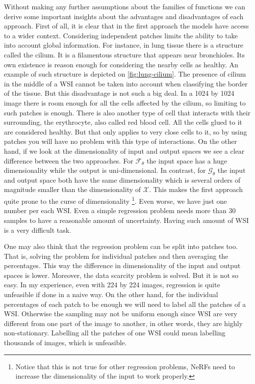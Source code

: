Without making any further assumptions about the families of functions we can derive some important insights about the advantages and disadvantages of each approach. First of all, it is clear that in the first approach the models have access to a wider context. Considering independent patches limits the ability to take into account global information. For instance, in lung tissue there is a structure called the cilium. It is a filamentous structure that appears near bronchioles. Its own existence is reason enough for considering the nearby cells as healthy. An example of such structure is depicted on \autoref{fig:lung-cilium}. The presence of cilium in the middle of a WSI cannot be taken into account when classifying the border of the tissue. But this disadvantage is not such a big deal. In a 1024 by 1024 image there is room enough for all the cells affected by the cilium, so limiting to such patches is enough. There is also another type of cell that interacts with their surrounding, the erythrocyte, also called red blood cell. All the cells glued to it are considered healthy. But that only applies to very close cells to it, so by using patches you will have no problem with this type of interactions. On the other hand, if we look at the dimensionality of input and output spaces we see a clear difference between the two approaches. For $\mathcal{F}_\theta$ the input space has a huge dimensionality while the output is uni-dimensional. In contrast, for $\mathcal{G}_\theta$ the input and output space both have the same dimensionality which is several orders of magnitude smaller than the dimensionality of $\mathcal{X}$. This makes the first approach quite prone to the curse of dimensionality \cite{AnalyticsVidhya}\footnote{Notice that this is not true for other regression problems, NeRFs \cite{mildenhall2020nerf} need to increase the dimensionality of the input to work properly.}. Even worse, we have just one number per each WSI. Even a simple regression problem needs more than 30 samples to have a reasonable amount of uncertainty. Having such amount of WSI is a very difficult task.

One may also think that the regression problem can be split into patches too. That is, solving the problem for individual patches and then averaging the percentages. This way the difference in dimensionality of the input and output spaces is lower. Moreover, the data scarcity problem is solved. But it is not so easy. In my experience, even with 224 by 224 images, regression is quite unfeasible if done in a naive way. On the other hand, for the individual percentages of each patch to be enough we will need to label all the patches of a WSI. Otherwise the sampling may not be uniform enough since WSI are very different from one part of the image to another, in other words, they are highly non-stationary. Labelling all the patches of one WSI could mean labelling thousands of images, which is unfeasible.

